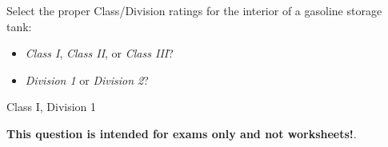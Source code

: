 

Select the proper Class/Division ratings for the interior of a gasoline storage tank:

\begin{itemize}
\item{} {\it Class I}, {\it Class II}, or {\it Class III}?
\vskip 10pt
\item{} {\it Division 1} or {\it Division 2}?
\end{itemize}







Class I, Division 1







{\bf This question is intended for exams only and not worksheets!}.



